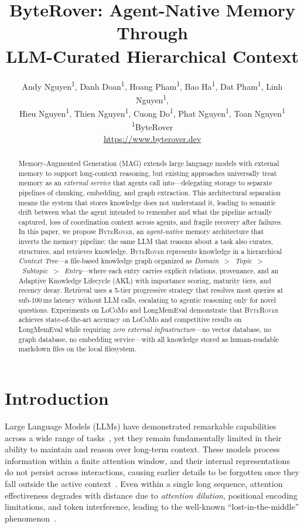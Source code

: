 \documentclass[11pt]{article}
\title{\textbf{ByteRover: Agent-Native Memory Through \\ LLM-Curated Hierarchical Context}}
\author{
  Andy Nguyen\textsuperscript{1},
  Danh Doan\textsuperscript{1},
  Hoang Pham\textsuperscript{1},
  Bao Ha\textsuperscript{1},
  Dat Pham\textsuperscript{1},
  Linh Nguyen\textsuperscript{1},\\
  Hieu Nguyen\textsuperscript{1},
  Thien Nguyen\textsuperscript{1},
  Cuong Do\textsuperscript{1},
  Phat Nguyen\textsuperscript{1},
  Toan Nguyen\textsuperscript{1} \\[6pt]
  \textsuperscript{1}ByteRover \\
  \url{https://www.byterover.dev}
}
\date{}
\newcommand{\byterover}{\textsc{ByteRover}}
\newcommand{\contexttree}{\textit{Context Tree}}
\begin{document}
\maketitle

\begin{abstract}
Memory-Augmented Generation (MAG) extends large language models with external memory to support long-context reasoning,
but existing approaches universally treat memory as an \emph{external service} that agents call into---delegating
storage to separate pipelines of chunking, embedding, and graph extraction.
This architectural separation means the system that stores knowledge does not understand it,
leading to semantic drift between what the agent intended to remember and what the pipeline actually captured,
loss of coordination context across agents, and fragile recovery after failures.
In this paper, we propose \byterover{}, an \emph{agent-native} memory architecture that inverts
the memory pipeline: the same LLM that reasons about a task also curates, structures, and retrieves knowledge.
\byterover{} represents knowledge in a hierarchical \contexttree{}---a file-based knowledge graph organized as
\textit{Domain~$>$~Topic~$>$~Subtopic~$>$~Entry}---where each entry carries explicit relations,
provenance, and an Adaptive Knowledge Lifecycle (AKL) with importance scoring, maturity tiers, and recency decay.
Retrieval uses a 5-tier progressive strategy that resolves most queries at sub-100\,ms latency
without LLM calls, escalating to agentic reasoning only for novel questions.
Experiments on LoCoMo and LongMemEval demonstrate that \byterover{} achieves
state-of-the-art accuracy on LoCoMo and competitive results on LongMemEval
while requiring \emph{zero external infrastructure}---no vector database,
no graph database, no embedding service---with all knowledge stored as human-readable markdown files on the local filesystem.
\end{abstract}


\section{Introduction}
\label{sec:intro}

Large Language Models (LLMs) have demonstrated remarkable capabilities across a wide range of tasks~\citep{brown2020language,achiam2023gpt4,wei2022chain},
yet they remain fundamentally limited in their ability to maintain and reason over long-term context.
These models process information within a finite attention window,
and their internal representations do not persist across interactions,
causing earlier details to be forgotten once they fall outside the active context~\citep{brown2020language,beltagy2020longformer}.
Even within a single long sequence, attention effectiveness degrades with distance
due to \emph{attention dilution}, positional encoding limitations, and token interference,
leading to the well-known ``lost-in-the-middle'' phenomenon~\citep{liu2024lost,press2021train}.
\end{document}
